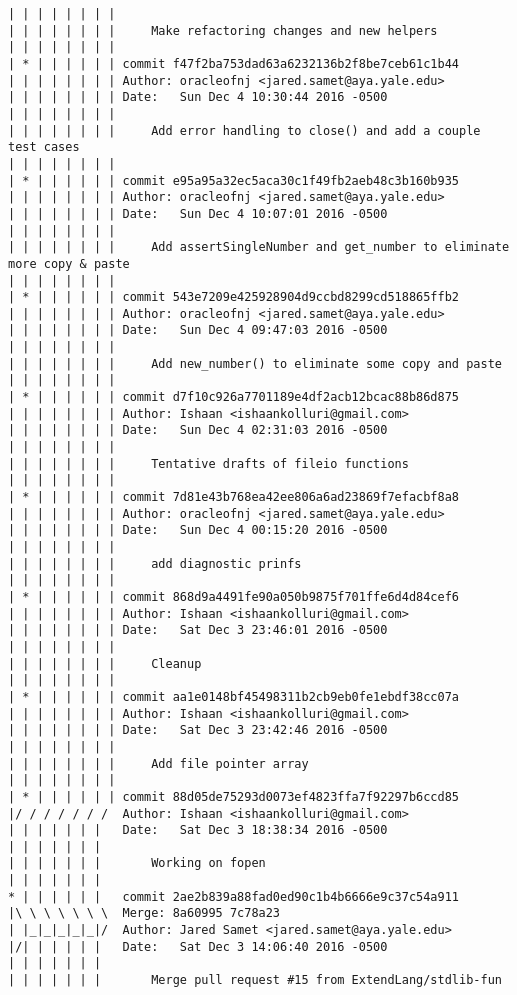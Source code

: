 \begin{lstlisting}
| | | | | | | | 
| | | | | | | |     Make refactoring changes and new helpers
| | | | | | | |         
| * | | | | | | commit f47f2ba753dad63a6232136b2f8be7ceb61c1b44
| | | | | | | | Author: oracleofnj <jared.samet@aya.yale.edu>
| | | | | | | | Date:   Sun Dec 4 10:30:44 2016 -0500
| | | | | | | | 
| | | | | | | |     Add error handling to close() and add a couple test cases
| | | | | | | |         
| * | | | | | | commit e95a95a32ec5aca30c1f49fb2aeb48c3b160b935
| | | | | | | | Author: oracleofnj <jared.samet@aya.yale.edu>
| | | | | | | | Date:   Sun Dec 4 10:07:01 2016 -0500
| | | | | | | | 
| | | | | | | |     Add assertSingleNumber and get_number to eliminate more copy & paste
| | | | | | | |         
| * | | | | | | commit 543e7209e425928904d9ccbd8299cd518865ffb2
| | | | | | | | Author: oracleofnj <jared.samet@aya.yale.edu>
| | | | | | | | Date:   Sun Dec 4 09:47:03 2016 -0500
| | | | | | | | 
| | | | | | | |     Add new_number() to eliminate some copy and paste
| | | | | | | |         
| * | | | | | | commit d7f10c926a7701189e4df2acb12bcac88b86d875
| | | | | | | | Author: Ishaan <ishaankolluri@gmail.com>
| | | | | | | | Date:   Sun Dec 4 02:31:03 2016 -0500
| | | | | | | | 
| | | | | | | |     Tentative drafts of fileio functions
| | | | | | | |         
| * | | | | | | commit 7d81e43b768ea42ee806a6ad23869f7efacbf8a8
| | | | | | | | Author: oracleofnj <jared.samet@aya.yale.edu>
| | | | | | | | Date:   Sun Dec 4 00:15:20 2016 -0500
| | | | | | | | 
| | | | | | | |     add diagnostic prinfs
| | | | | | | |         
| * | | | | | | commit 868d9a4491fe90a050b9875f701ffe6d4d84cef6
| | | | | | | | Author: Ishaan <ishaankolluri@gmail.com>
| | | | | | | | Date:   Sat Dec 3 23:46:01 2016 -0500
| | | | | | | | 
| | | | | | | |     Cleanup
| | | | | | | |         
| * | | | | | | commit aa1e0148bf45498311b2cb9eb0fe1ebdf38cc07a
| | | | | | | | Author: Ishaan <ishaankolluri@gmail.com>
| | | | | | | | Date:   Sat Dec 3 23:42:46 2016 -0500
| | | | | | | | 
| | | | | | | |     Add file pointer array
| | | | | | | |         
| * | | | | | | commit 88d05de75293d0073ef4823ffa7f92297b6ccd85
|/ / / / / / /  Author: Ishaan <ishaankolluri@gmail.com>
| | | | | | |   Date:   Sat Dec 3 18:38:34 2016 -0500
| | | | | | |   
| | | | | | |       Working on fopen
| | | | | | |          
* | | | | | |   commit 2ae2b839a88fad0ed90c1b4b6666e9c37c54a911
|\ \ \ \ \ \ \  Merge: 8a60995 7c78a23
| |_|_|_|_|_|/  Author: Jared Samet <jared.samet@aya.yale.edu>
|/| | | | | |   Date:   Sat Dec 3 14:06:40 2016 -0500
| | | | | | |   
| | | | | | |       Merge pull request #15 from ExtendLang/stdlib-fun

\end{lstlisting}
